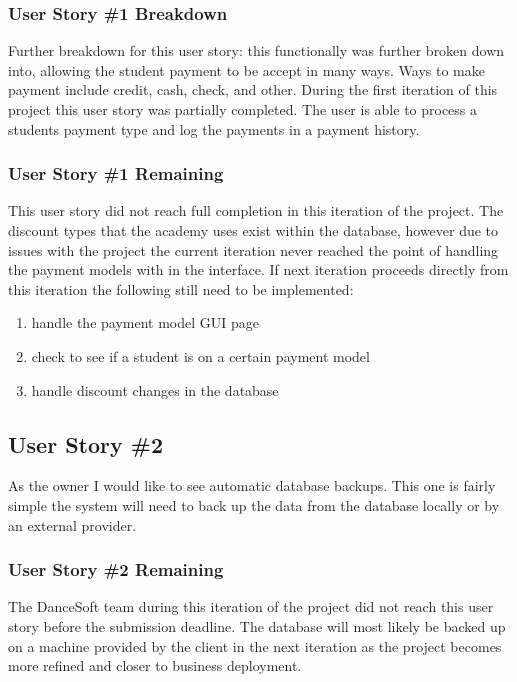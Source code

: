 \subsubsection{User Story \#1 Breakdown}
Further breakdown for this user story: this functionally was further broken down into, allowing the student payment to be accept in many ways. Ways to make payment include credit, cash, check, and other. During the first iteration of this project this user story was partially completed. The user is able to process a students payment  type and log the payments in a payment history.

\subsubsection{User Story \#1 Remaining}
This user story did not reach full completion in this iteration of the project. The discount types that the academy uses exist within the database, however due to issues with the project the current iteration never reached the point of handling the payment models with in the interface. If next iteration proceeds directly from this iteration the following still need to be implemented:

\begin{enumerate}
\item handle the payment model GUI page
\item check to see if a student is on a certain payment model
\item handle discount changes in the database
\end{enumerate}

\subsection{User Story \#2}
As the owner I would like to see automatic database backups. This one is fairly simple the system will need to back up the data from the database locally or by an external provider.

\subsubsection{User Story \#2 Remaining}
The DanceSoft team during this iteration of the project did not reach this user story before the submission deadline. The database will most likely be backed up on a machine provided by the client in the next iteration as the project becomes more refined and closer to business deployment. 


